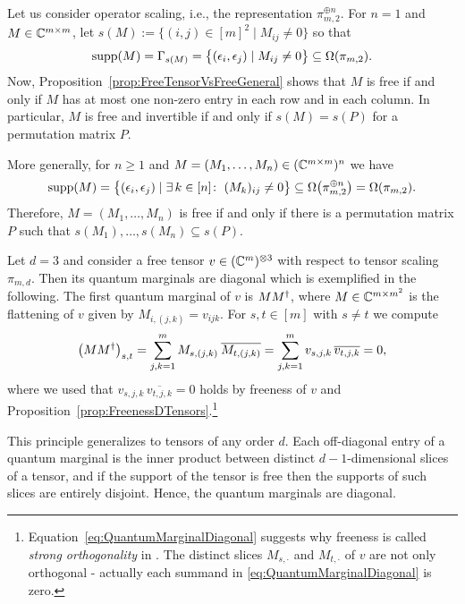 \begin{example} \label{ex:FreenessOperatorScaling}
	Let us consider operator scaling, i.e., the representation $\pi_{m,2}^{\oplus n}$. For $n=1$ and $M \in \mathbb C^{m \times m}$, let $s(M) := \{ (i,j) \in [m]^2 \mid M_{ij} \neq 0 \}$ so that
		\[ \operatorname{supp}(M) = \Gamma_{s(M)} = \big\{ (\epsilon_i, \epsilon_j) \mid M_{ij} \neq 0 \big\} \subseteq \Omega(\pi_{m,2}). \]
	Now, Proposition~\ref{prop:FreeTensorVsFreeGeneral} shows that $M$ is free if and only if $M$ has at most one non-zero entry in each row and in each column. In particular, $M$ is free and invertible if and only if $s(M) = s(P)$ for a permutation matrix $P$.
	
	More generally, for $n \geq 1$ and $M = (M_1, \ldots, M_n) \in (\mathbb C^{m \times m})^n$ we have 
		\[ \operatorname{supp}(M) = \big\{ (\epsilon_i, \epsilon_j) \mid \exists \, k \in [n] \colon \;  (M_k)_{ij} \neq 0 \big\} \subseteq \Omega \big(\pi_{m,2}^{\oplus n} \big) = \Omega(\pi_{m,2}). \]
	Therefore, $M = (M_1, \ldots, M_n)$ is free if and only if there is a permutation matrix $P$ such that $s(M_1), \ldots, s(M_n) \subseteq s(P)$.
	\hfill\exSymbol
\end{example}

\begin{example}
	Let $d =3$ and consider a free tensor $v \in (\mathbb C^m)^{\otimes 3}$ with respect to tensor scaling $\pi_{m,d}$. Then its quantum marginals are diagonal which is exemplified in the following.
	The first quantum marginal of $v$ is $M M^{\dagger}$, where $M \in \mathbb C^{m \times m^2}$ is the flattening of $v$ given by $M_{i,(j,k)} = v_{ijk}$.
	For $s,t \in [m]$ with $s \neq t$ we compute
		\begin{equation}\label{eq:QuantumMarginalDiagonal}
			\big( M M^{\dagger} \big)_{s,t} = \sum_{j,k=1}^m M_{s,(j,k)} \: \overline{ M_{t,(j,k)} }
			= \sum_{j,k =1}^m v_{s,j,k}\, \overline{v_{t,j,k}} = 0,
		\end{equation}
	where we used that $v_{s,j,k}\, \overline{v_{t,j,k}} = 0$ holds by freeness of $v$ and Proposition~\eqref{prop:FreenessDTensors}.\footnote{Equation~\eqref{eq:QuantumMarginalDiagonal} suggests why freeness is called \emph{strong orthogonality} in \cite{dadok1985polar}. The distinct slices $M_{s,\cdot}$ and $M_{t, \cdot}$ of $v$ are not only orthogonal - actually each summand in \eqref{eq:QuantumMarginalDiagonal} is zero.}
	
	This principle generalizes to tensors of any order $d$. Each off-diagonal entry of a quantum marginal is the inner product between distinct $d-1$-dimensional slices of a tensor, and if the support of the tensor is free then the supports of such slices are entirely disjoint. Hence, the quantum marginals are diagonal.
	\hfill\exSymbol
\end{example}

